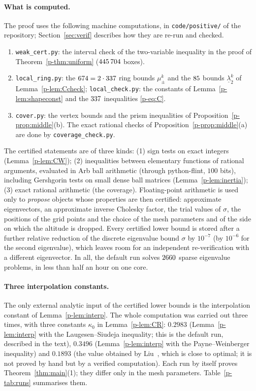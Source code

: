 \documentclass[11pt]{article}
\theoremstyle{remark}
\begin{document}
\paragraph{What is computed.} The proof uses the following machine computations, in
\texttt{code/positive/} of the repository; Section~\ref{sec:verif} describes how they are re-run and
checked.
\begin{enumerate}
\item \texttt{weak\_cert.py}: the interval check of the two-variable inequality in the proof of
Theorem~\ref{p-thm:uniform} ($445\,704$ boxes).
\item \texttt{local\_ring.py}: the $674=2\cdot337$ ring bounds $\mu_\pm^k$ and the
$85$ bounds $\underline\lambda_2^k$ of Lemma~\ref{p-lem:Ccheck}; \texttt{local\_check.py}: the
constants of Lemma~\ref{p-lem:shapeconst} and the $337$ inequalities \eqref{p-eq:C}.
\item \texttt{cover.py}: the vertex bounds and the prism inequalities of
Proposition~\ref{p-prop:middle}(b). The exact rational checks of
Proposition~\ref{p-prop:middle}(a) are done by \texttt{coverage\_check.py}.
\end{enumerate}
The certified statements are of three kinds: (1) sign tests on exact integers
(Lemma~\ref{p-lem:CW}); (2) inequalities between elementary functions of rational arguments,
evaluated in Arb ball arithmetic \cite{Arb} (through python-flint, $100$ bits), including
Gershgorin tests on small dense ball matrices (Lemma~\ref{p-lem:inertia}); (3) exact rational
arithmetic (the coverage). Floating-point arithmetic is used only to \emph{propose} objects whose
properties are then certified: approximate eigenvectors, an approximate inverse Cholesky
factor, the trial values of $\sigma$, the positions of the grid points and the choice of the mesh
parameters and of the side on which the altitude is dropped. Every certified
lower bound is stored after a further relative reduction of the discrete eigenvalue bound
$\sigma$ by $10^{-7}$ (by $10^{-6}$ for the second eigenvalue), which leaves room for an
independent re-verification with a different eigenvector. In all, the default run solves
$2660$ sparse eigenvalue problems, in less than half an hour on one core.

\paragraph{Three interpolation constants.} The only external analytic input of the certified
lower bounds is the interpolation constant of Lemma~\ref{p-lem:interp}. The whole computation was
carried out three times, with three constants $\kappa_0$ in Lemma~\ref{p-lem:CR}:
$0.2983$ (Lemma~\ref{p-lem:interp} with the Laugesen--Siudeja inequality; this is the default run,
described in the text), $0.3496$ (Lemma~\ref{p-lem:interp} with the Payne--Weinberger inequality)
and $0.1893$ (the value obtained by Liu~\cite{Liu}, which is close to optimal; it is not proved by
hand but by a verified computation). Each run by itself proves Theorem~\ref{thm:main}(1); they differ
only in the mesh parameters. Table~\ref{p-tab:runs} summarises them.
\end{document}
